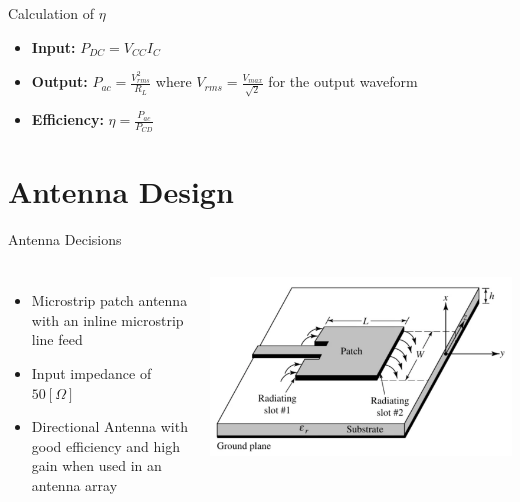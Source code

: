 \documentclass{beamer}
\begin{document}
\begin{frame}{Calculation of \(\eta\)}
\begin{itemize}
  \item <1-> \textbf{Input:} \(P_{DC} = V_{CC}I_C\)
  \item <1-> \textbf{Output:} \(P_{ac} = \frac{V_{rms}^2}{R_L}\) where \(V_{rms}=\frac{V_{max}}{\sqrt{2}}\) for the output waveform
  \item <1-> \textbf{Efficiency:} \(\eta=\frac{P_{ac}}{P_{CD}}\)
\end{itemize}

\end{frame}


\section{Antenna Design}
\begin{frame}{Antenna Decisions}
\begin{columns}
    \begin{itemize}
  
    \item <1-> Microstrip patch antenna with an inline microstrip line feed
    \item <2-> Input impedance of \(50[\Omega]\)
    \item <3-> Directional Antenna with good efficiency and high gain when used in an antenna array
  \end{itemize}

  \includegraphics[width=\textwidth]{images/patch_antenna_labelled_diag.png}
\end{columns}

\end{frame}
\end{document}
